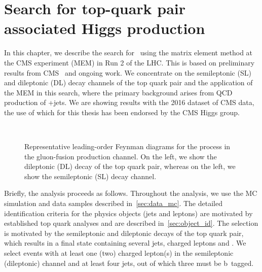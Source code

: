 \chapter{Search for top-quark pair associated Higgs production}
\label{sec:tth}
In this chapter, we describe the search for~\ttHbb\xspace using the matrix element method at the CMS experiment (MEM) in Run 2 of the LHC. This is based on preliminary results from CMS~\cite{CMS:2016qwm,CMS:2016zbb} and ongoing work. We concentrate on the semileptonic (SL) and dileptonic (DL) decay channels of the top quark pair and the application of the MEM in this search, where the primary background arises from QCD production of \ttbar+jets. We are showing results with the 2016 dataset of CMS data, the use of which for this thesis has been endorsed by the CMS Higgs group.

\begin{figure}
\begin{centering}
 \\
\caption[Representative leading-order Feynman diagrams for the \ttHbb\xspace process]{Representative leading-order Feynman diagrams for the \ttHbb\xspace process in the gluon-fusion production channel. On the left, we show the dileptonic (DL) decay of the top quark pair, whereas on the left, we show the semileptonic (SL) decay channel.}
\label{fig:tth_diagrams}
\end{centering}
\end{figure}

Briefly, the analysis proceeds as follows. Throughout the analysis, we use the MC simulation and data samples described in~\cref{sec:data_mc}. The detailed identification criteria for the physics objects (jets and leptons) are motivated by established top quark analyses and are described in~\cref{sec:object_id}. The selection is motivated by the semileptonic and dileptonic decays of the top quark pair, which results in a final state containing several jets, charged leptons and \MET. We select events with at least one (two) charged lepton(s) in the semileptonic (dileptonic) channel and at least four jets, out of which three must be b~tagged.

